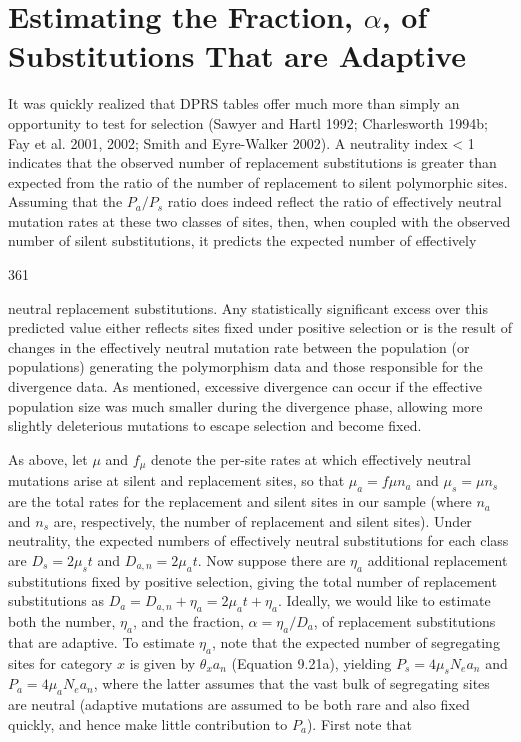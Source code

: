 \documentclass{article}
\begin{document}
\section{Estimating the Fraction,  $ \alpha $, of Substitutions That are Adaptive}
It was quickly realized that DPRS tables offer much more than simply an opportunity to test for selection (Sawyer and Hartl 1992; Charlesworth 1994b; Fay et al. 2001, 2002; Smith and Eyre-Walker 2002). A neutrality index < 1 indicates that the observed number of replacement substitutions is greater than expected from the ratio of the number of replacement to silent polymorphic sites. Assuming that the  $ P_{a}/P_{s} $ ratio does indeed reflect the ratio of effectively neutral mutation rates at these two classes of sites, then, when coupled with the observed number of silent substitutions, it predicts the expected number of effectively

361

neutral replacement substitutions. Any statistically significant excess over this predicted value either reflects sites fixed under positive selection or is the result of changes in the effectively neutral mutation rate between the population (or populations) generating the polymorphism data and those responsible for the divergence data. As mentioned, excessive divergence can occur if the effective population size was much smaller during the divergence phase, allowing more slightly deleterious mutations to escape selection and become fixed.

As above, let $\mu$ and $f_\mu$ denote the per-site rates at which effectively neutral mutations arise at silent and replacement sites, so that $\mu_a = f\mu n_a$ and $\mu_s = \mu n_s$ are the total rates for the replacement and silent sites in our sample (where $n_a$ and $n_s$ are, respectively, the number of replacement and silent sites). Under neutrality, the expected numbers of effectively neutral substitutions for each class are $D_s = 2\mu_s t$ and $D_{a,n} = 2\mu_a t$. Now suppose there are $\eta_a$ additional replacement substitutions fixed by positive selection, giving the total number of replacement substitutions as $D_a = D_{a,n} + \eta_a = 2\mu_a t + \eta_a$. Ideally, we would like to estimate both the number, $\eta_a$, and the fraction, $\alpha = \eta_a / D_a$, of replacement substitutions that are adaptive. To estimate $\eta_a$, note that the expected number of segregating sites for category $x$ is given by $\theta_x a_n$ (Equation 9.21a), yielding $P_s = 4\mu_s N_e a_n$ and $P_a = 4\mu_a N_e a_n$, where the latter assumes that the vast bulk of segregating sites are neutral (adaptive mutations are assumed to be both rare and also fixed quickly, and hence make little contribution to $P_a$). First note that
\end{document}
